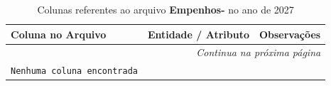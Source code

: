 \small
\begin{longtable}{|p{4.0cm}|p{5.0cm}|p{5.5cm}|}
\caption{Colunas referentes ao arquivo \textbf{Empenhos-} no ano de 2027}
\label{tabela-mapeamento-base-grupo-Empenhos--periodo-2027} \\ 
    \hline
    \textbf{Coluna no Arquivo} & \textbf{Entidade / Atributo} & \textbf{Observações} \\ \hline
    \endhead

    \hline \multicolumn{3}{r}{\textit{Continua na próxima página}} \\ \hline
    \endfoot

    \hline
    \endlastfoot

    \texttt{Nenhuma coluna encontrada} &  & \\ \hline 
\end{longtable}
\normalsize

\vspace{0.5cm}

